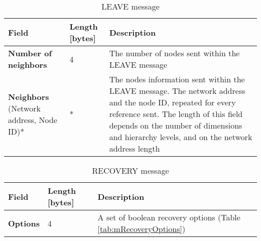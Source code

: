 \begin{table}[H]
\scriptsize
\begin{center}
\begin{tabular}{p{3cm} p{2cm} p{9.5cm}}
	\hline
	\textbf{Field}						& \textbf{Length} [bytes]				& \textbf{Description}				\\[1mm]
    \hline
	\textbf{Number of neighbors}	& 4											& The number of nodes sent within the LEAVE message					\\[1.5mm]
	\textbf{Neighbors} \newline (Network address, Node ID)*			& *			& The nodes information sent within the LEAVE message. The network address and the node ID, repeated for every reference sent. \newline * The length of this field depends on the number of dimensions and hierarchy levels, and on the network address length		\\[1.5mm]	
    \hline
\end{tabular}
\end{center}
\caption{LEAVE message}
\label{tab:mLeave}
\end{table}












\begin{table}[H]
\scriptsize
\begin{center}
\begin{tabular}{p{3cm} p{2cm} p{9.5cm}}
	\hline
	\textbf{Field}						& \textbf{Length} [bytes]				& \textbf{Description}				\\[1mm]
    \hline
	\textbf{Options}					& 4										& A set of boolean recovery options (Table \ref{tab:mRecoveryOptions})				\\[1.5mm]
    \hline
\end{tabular}
\end{center}
\caption{RECOVERY message}
\label{tab:mRecovery}
\end{table}

